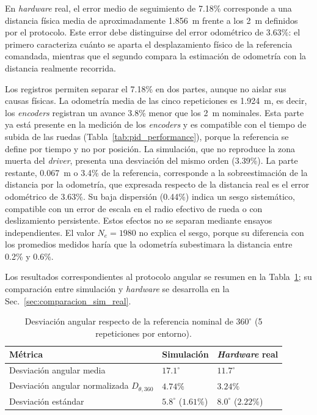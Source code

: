 En \textit{hardware} real, el error medio de seguimiento de 7.18\% corresponde a una
distancia física media de aproximadamente 1.856~m frente a los 2~m definidos
por el protocolo. Este error debe distinguirse del error odométrico de 3.63\%:
el primero caracteriza cuánto se aparta el desplazamiento físico de la
referencia comandada, mientras que el segundo compara la estimación de
odometría con la distancia realmente recorrida.

Los registros permiten separar el 7.18\% en dos partes, aunque no aislar sus
causas físicas. La odometría media de las cinco repeticiones es 1.924~m, es
decir, los \textit{encoders} registran un avance 3.8\% menor que los 2~m nominales.
Esta parte ya está presente en la medición de los \textit{encoders} y es compatible con
el tiempo de subida de las ruedas (Tabla~\ref{tab:pid_performance}), porque la
referencia se define por tiempo y no por posición. La simulación, que no
reproduce la zona muerta del \textit{driver}, presenta una desviación del mismo orden
(3.39\%). La parte restante, 0.067~m o 3.4\% de la referencia, corresponde a la
sobreestimación de la distancia por la odometría, que expresada respecto de la
distancia real es el error odométrico de 3.63\%. Su baja dispersión (0.44\%)
indica un sesgo sistemático, compatible con un error de escala en el radio
efectivo de rueda o con deslizamiento persistente. Estos efectos no se
separan mediante ensayos independientes. El valor $N_e=1980$ no explica el
sesgo, porque su diferencia con los promedios medidos haría que la odometría
subestimara la distancia entre 0.2\% y 0.6\%.

Los resultados correspondientes al protocolo angular se resumen en la Tabla~\ref{tab:resumen_giro}; su comparación entre simulación y \textit{hardware} se desarrolla en la Sec.~\ref{sec:comparacion_sim_real}.

\begin{table}[htbp]
\centering
\caption{Desviación angular respecto de la referencia nominal de $360^\circ$ (5 repeticiones por entorno).}
\label{tab:resumen_giro}
\small
\begin{tabular}{p{7.0cm} p{3.2cm} p{3.2cm}}
\toprule
\textbf{Métrica} & \textbf{Simulación} & \textbf{\textit{Hardware} real} \\
\midrule
Desviación angular media & $17.1^\circ$ & $11.7^\circ$ \\
Desviación angular normalizada $D_{\theta,360}$ & $4.74\%$ & $3.24\%$ \\
Desviación estándar & $5.8^\circ$ ($1.61\%$) & $8.0^\circ$ ($2.22\%$) \\
\bottomrule
\end{tabular}
\end{table}

